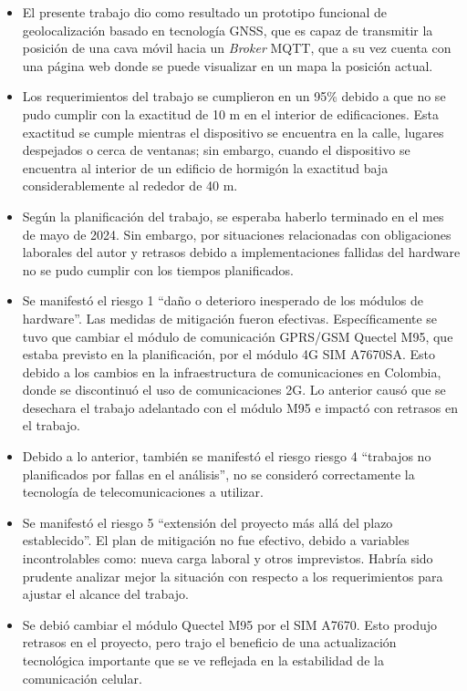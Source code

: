 \begin{itemize}
\item El presente trabajo dio como resultado un prototipo funcional de geolocalización basado en tecnología GNSS, que es capaz de transmitir la posición de una cava móvil hacia un \textit{Broker} MQTT, que a su vez cuenta con una página web donde se puede visualizar en un mapa la posición actual. 

\item Los requerimientos del trabajo se cumplieron en un 95\% debido a que no se pudo cumplir con la exactitud de 10 m en el interior de edificaciones. Esta exactitud se cumple mientras el dispositivo se encuentra en la calle, lugares despejados o cerca de ventanas; sin embargo, cuando el dispositivo se encuentra al interior de un edificio de hormigón la exactitud baja considerablemente al rededor de 40 m. 

\item Según la planificación del trabajo, se esperaba haberlo terminado en el mes de mayo de 2024. Sin embargo, por situaciones relacionadas con obligaciones laborales del autor y retrasos debido a implementaciones fallidas del hardware no se pudo cumplir con los tiempos planificados. 

\item Se manifestó el riesgo 1 ``daño o deterioro inesperado de los módulos de hardware''. Las medidas de mitigación fueron efectivas. Específicamente se tuvo que cambiar el módulo de comunicación GPRS/GSM Quectel M95, que estaba previsto en la planificación, por el módulo 4G SIM A7670SA. Esto debido a los cambios en la infraestructura de comunicaciones en Colombia, donde se discontinuó el uso de comunicaciones 2G. Lo anterior causó que se desechara el trabajo adelantado con el módulo M95 e impactó con retrasos en el trabajo. 

\item Debido a lo anterior, también se manifestó el riesgo riesgo 4 ``trabajos no planificados por fallas en el análisis'', no se consideró correctamente la tecnología de telecomunicaciones a utilizar.

\item Se manifestó el riesgo 5 ``extensión del proyecto más allá del plazo establecido''. El plan de mitigación no fue efectivo, debido a variables incontrolables como: nueva carga laboral y otros imprevistos. Habría sido prudente analizar mejor la situación con respecto a los requerimientos para ajustar el alcance del trabajo.

\item Se debió cambiar el módulo Quectel M95 por el SIM A7670. Esto produjo retrasos en el proyecto, pero trajo el beneficio de una actualización tecnológica importante que se ve reflejada en la estabilidad de la comunicación celular. 


\end{itemize}


